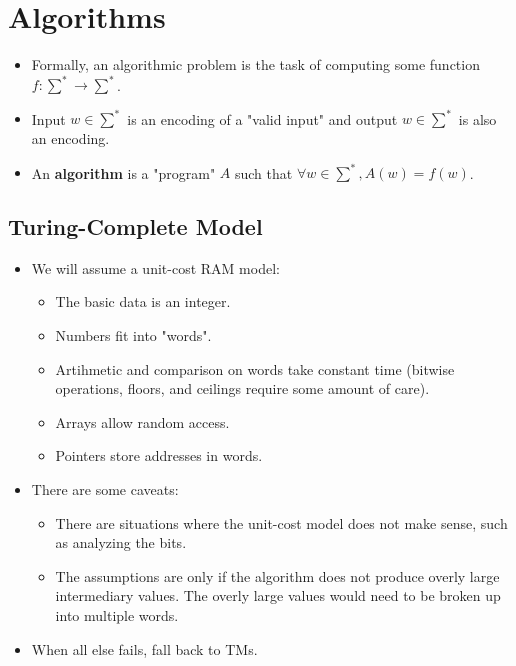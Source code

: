 
\section{Algorithms}
\begin{itemize}
    \item Formally, an algorithmic problem is the task of computing some function $f: \sum^{\ast} \rightarrow \sum^{\ast}$.
    \item Input $w \in \sum^{\ast}$ is an encoding of a "valid input" and output $w \in \sum^{\ast}$ is also an encoding.
    \item An \textbf{algorithm} is a "program" $A$ such that $\forall w \in \sum^{\ast}, A(w) = f(w)$.
\end{itemize}

\subsection{Turing-Complete Model}
\begin{itemize}
    \item We will assume a unit-cost RAM model:
    \begin{itemize}
        \item The basic data is an integer.
        \item Numbers fit into "words".
        \item Artihmetic and comparison on words take constant time (bitwise operations, floors, and ceilings require some amount of care).
        \item Arrays allow random access.
        \item Pointers store addresses in words.
    \end{itemize}
    \item There are some caveats:
    \begin{itemize}
        \item There are situations where the unit-cost model does not make sense, such as analyzing the bits.
        \item The assumptions are only if the algorithm does not produce overly large intermediary values. The overly large values would need to be broken up into multiple words.
    \end{itemize}
    \item When all else fails, fall back to TMs.
\end{itemize}

